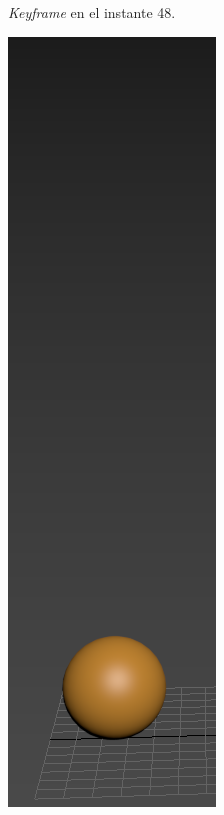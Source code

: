 \documentclass{article}
\begin{document}
\begin{figure}[H]
\begin{subfigure}[H]{0.15\textwidth}
	    \caption{\textit{Keyframe} en el instante 48.}
	\end{subfigure}
    \hfill
	\begin{subfigure}[H]{0.15\textwidth}
	    \centering
	    \includegraphics[width=\textwidth]{imagenes/Ejercicio 2/p1_suelo2.png}

\end{subfigure}
\end{figure}
\end{document}
